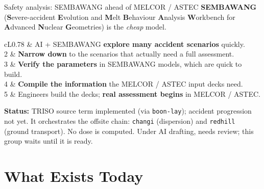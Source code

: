 \documentclass[aspectratio=169]{beamer}
\newcommand{\roadtab}[1]{{\footnotesize\setlength{\tabcolsep}{4pt}#1}}
\begin{document}
\begin{frame}{Safety analysis: SEMBAWANG ahead of MELCOR / ASTEC}
    \textbf{SEMBAWANG} (\textbf{S}evere-accident \textbf{E}volution and
    \textbf{M}elt \textbf{B}ehaviour \textbf{A}nalysis \textbf{W}orkbench for
    \textbf{A}dvanced \textbf{N}uclear \textbf{G}eometries) is the
    \emph{cheap} model.

    \medskip
    \roadtab{
    \begin{tabular}{cL{0.78\textwidth}}
        \toprule
        1 & AI + SEMBAWANG \textbf{explore many accident scenarios} quickly. \\
        2 & \textbf{Narrow down} to the scenarios that actually need a
            full assessment. \\
        3 & \textbf{Verify the parameters} in SEMBAWANG models, which are
            quick to build. \\
        4 & \textbf{Compile the information} the MELCOR / ASTEC input decks
            need. \\
        5 & Engineers build the decks; \textbf{real assessment begins} in
            MELCOR / ASTEC. \\
        \bottomrule
    \end{tabular}}

    \medskip
    \footnotesize
    \textbf{Status:} TRISO source term implemented (via \texttt{boon-lay});
    accident progression not yet. It orchestrates the offsite chain:
    \texttt{changi} (dispersion) and \texttt{redhill} (ground transport). No
    dose is computed. Under AI drafting, needs review; this group waits until
    it is ready.
\end{frame}


\section{What Exists Today}
\end{document}
